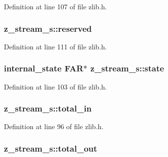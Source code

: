 Definition at line 107 of file zlib.\-h.

\hypertarget{structz__stream__s_add73791dd19b49c9c68f3f3d328c37db}{
\subsubsection[{reserved}]{ z\-\_\-stream\-\_\-s\-::reserved}}\label{structz__stream__s_add73791dd19b49c9c68f3f3d328c37db}


Definition at line 111 of file zlib.\-h.

\hypertarget{structz__stream__s_ac4a114217a1868dc6fbe7d1f5bda126b}{
\subsubsection[{state}]{ {\bf internal\-\_\-state} F\-A\-R$\ast$ z\-\_\-stream\-\_\-s\-::state}}\label{structz__stream__s_ac4a114217a1868dc6fbe7d1f5bda126b}


Definition at line 103 of file zlib.\-h.

\hypertarget{structz__stream__s_aa8f408b9632737dc21519fa1ed34b08d}{
\subsubsection[{total\-\_\-in}]{ z\-\_\-stream\-\_\-s\-::total\-\_\-in}}\label{structz__stream__s_aa8f408b9632737dc21519fa1ed34b08d}


Definition at line 96 of file zlib.\-h.

\hypertarget{structz__stream__s_abae26f1f236cf920250b9d37fdf009c1}{
\subsubsection[{total\-\_\-out}]{ z\-\_\-stream\-\_\-s\-::total\-\_\-out}}\label{structz__stream__s_abae26f1f236cf920250b9d37fdf009c1}


